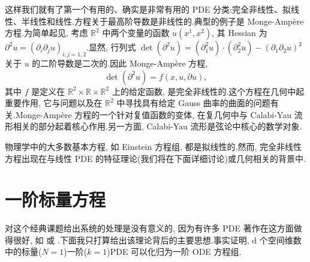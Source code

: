 这样我们就有了第一个有用的、确实是非常有用的 PDE 分类:完全非线性、拟线性、半线性和线性.方程关于最高阶导数是非线性的.典型的例子是 Monge-Ampère 方程.为简单起见, 考虑 $\mathbb{R}^{2}$ 中两个变量的函数 $u(x^{1}, x^{2})$, 其 Hessian 为 $\partial^{2} u = (\partial_{i} \partial_{j} u)_{i, j = 1, 2}$.显然, 行列式
$\det(\partial^{2} u) = (\partial_{1}^{2} u) \cdot (\partial_{2}^{2} u) - (\partial_{1} \partial_{2} u)^{2}$
关于 $u$ 的二阶导数是二次的.因此 Monge-Ampère 方程,
\begin{equation}
\det(\partial^{2} u) = f(x, u, \partial u), \label{eq:c2-89}
\end{equation}
其中 $f$ 是定义在 $\mathbb{R}^{2} \times \mathbb{R} \times \mathbb{R}^{2}$ 上的给定函数, 是完全非线性的.这个方程在几何中起重要作用, 它与问题以及在 $\mathbb{R}^{2}$ 中寻找具有给定 Gauss 曲率的曲面的问题有关.Monge-Ampère 方程的一个针对复值函数的变体, 在复几何中与 Calabi-Yau 流形相关的部分起着核心作用.另一方面, Calabi-Yau 流形是弦论中核心的数学对象.

\begin{remark*}
物理学中的大多数基本方程, 如 Einstein 方程组, 都是拟线性的.然而, 完全非线性方程出现在与线性 PDE 的特征理论(我们将在下面详细讨论)或几何相关的背景中.
\end{remark*}

\section{一阶标量方程}

对这个经典课题给出系统的处理是没有意义的, 因为有许多 PDE 著作在这方面做得很好, 如 \cite{e} 或 \cite{j}.下面我只打算给出该理论背后的主要思想.事实证明, d 个空间维数中的标量($N = 1$)一阶($k = 1$)PDE 可以化归为一阶 ODE 方程组.

